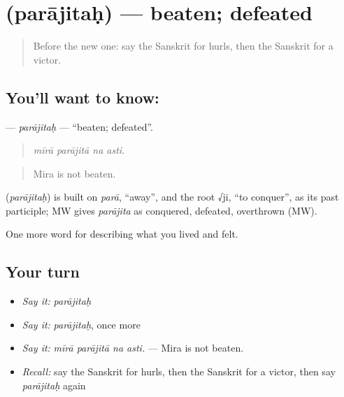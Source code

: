 \section[\texorpdfstring{\sk{पराजितः} (parājitaḥ)}{पराजितः (parājitaḥ)}]{ (parājitaḥ) — beaten; defeated}

\label{lesson:SA-C524-parajitah}



\begin{quote}
Before the new one: say the Sanskrit for hurls, then the Sanskrit for a victor.
\end{quote}

\subsection*{You'll want to know: }
\textbf{} — \emph{parājitaḥ} — \textquotedblleft{}beaten; defeated\textquotedblright{}.

\begin{quote}
   
\end{quote}

\begin{quote}
\emph{mīrā parājitā na asti.}
\end{quote}

\begin{quote}
Mira is not beaten.
\end{quote}

\begin{cousinweb}
\textbf{} (\emph{parājitaḥ}) is built on \emph{parā}, \textquotedblleft{}away\textquotedblright{}, and the root √ji, \textquotedblleft{}to conquer\textquotedblright{}, as its past participle; MW gives \emph{parājita} as conquered, defeated, overthrown (MW).
\end{cousinweb}

\begin{grammarlens}[title={What you've built}]
One more word for describing what you lived and felt.
\end{grammarlens}

\subsection*{Your turn}
\begin{itemize}
\raggedright
  \item \emph{Say it:} \emph{parājitaḥ}
  \item \emph{Say it:} \emph{parājitaḥ}, once more
  \item \emph{Say it:} \emph{mīrā parājitā na asti.} — Mira is not beaten.
  \item \emph{Recall:} say the Sanskrit for hurls, then the Sanskrit for a victor, then say \emph{parājitaḥ} again
\end{itemize}

